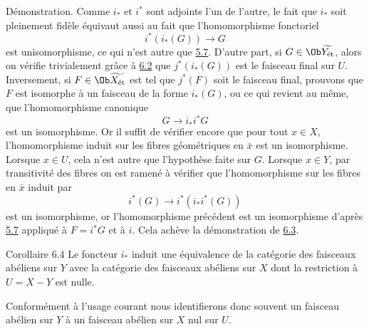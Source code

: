 \documentclass[10pt]{../fichiers-configuration-latex/smfart}
\begin{document}
Démonstration. Comme $i_{\ast}$ et $i^{\ast}$ sont adjoints l'un de
l'autre, le fait que $i_{\ast}$ soit pleinement fidèle équivaut
aussi au fait que l'homomorphisme fonctoriel
$$
i^{\ast} (i_{\ast}(G)) \to G
$$
est un\pageoriginale isomorphisme, ce qui n'est autre que
\hyperref[VIII.cor5.7]{5.7}. D'autre part, si $G \in \Ob
\widetilde{Y_{\text{ét}}}$, alors on vérifie trivialement grâce à
\hyperref[VIII.cor6.2]{6.2} que $j^{\ast} (i_{\ast}(G))$ est le faisceau final
sur $U$. Inversement, si $F \in \Ob \widetilde{X_{\text{ét}}}$ est
tel que $j^{\ast}(F)$ soit le faisceau final, prouvons que $F$ est
isomorphe à un faisceau de la forme $i_{\ast}(G)$, ou ce qui revient
au même, que l'homomorphisme canonique
$$
G \to i_{\ast} i^{\ast} G
$$
est un isomorphisme. Or il suffit de vérifier encore que pour tout $x
\in X$, l'homomorphisme induit sur les fibres géométriques en
$\bar{x}$ est un isomorphisme. Lorsque $x \in U$, cela n'est autre que
l'hypothèse faite sur $G$. Lorsque $x \in Y$, par transitivité des
fibres on est ramené à vérifier que l'homomorphisme sur les fibres en
$\bar{x}$ induit par
$$
i^{\ast} (G) \to i^{\ast} (i_{\ast} i^{\ast} (G))
$$
est un isomorphisme, or l'homomorphisme précédent est un isomorphisme
d'après \hyperref[VIII.cor5.7]{5.7} appliqué à $F = i^{\ast} G$ et à $i$. Cela achève la
démonstration de \hyperref[VIII.thm6.3]{6.3}.

\begin{enonce*}{Corollaire 6.4}
Le foncteur $i_{\ast}$ induit une équivalence de la catégorie des
faisceaux abéliens sur $Y$ avec la catégorie des faisceaux abéliens
sur $X$ dont la restriction à $U = X - Y$ est nulle.
\end{enonce*}

Conformément à l'usage courant nous identifierons donc souvent un
faisceau abélien sur $Y$  à un faisceau abélien sur $X$ nul sur $U$.

\setcounter{subsection}{4}
\subsection{}
\end{document}
